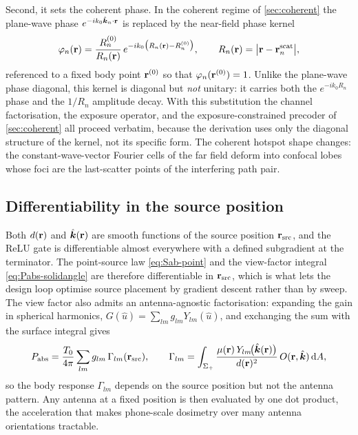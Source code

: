 Second, it sets the coherent phase. In the coherent regime of
\cref{sec:coherent} the plane-wave phase $e^{-ik_0\hat{\bm{k}}_n\cdot\mathbf{r}}$ is
replaced by the near-field phase kernel
\begin{equation}\label{eq:NF-kernel}
  \varphi_n(\mathbf{r})=\frac{R_n^{(0)}}{R_n(\mathbf{r})}\,
                 e^{-ik_0\bigl(R_n(\mathbf{r})-R_n^{(0)}\bigr)},
  \qquad R_n(\mathbf{r})=\abs{\mathbf{r}-\mathbf{r}_n^{\mathrm{scat}}},
\end{equation}
referenced to a fixed body point $\mathbf{r}^{(0)}$ so that
$\varphi_n(\mathbf{r}^{(0)})=1$. Unlike the plane-wave phase diagonal, this
kernel is diagonal but \emph{not} unitary: it carries both the
$e^{-ik_0 R_n}$ phase and the $1/R_n$ amplitude decay. With this
substitution the channel factorisation, the exposure operator, and the
exposure-constrained precoder of \cref{sec:coherent} all proceed
verbatim, because the derivation uses only the diagonal structure of
the kernel, not its specific form. The coherent hotspot shape changes:
the constant-wave-vector Fourier cells of the far field deform into
confocal lobes whose foci are the last-scatter points of the
interfering path pair.

\subsection{Differentiability in the source position}

Both $d(\mathbf{r})$ and $\hat{\bm{k}}(\mathbf{r})$ are smooth functions of the source
position $\mathbf{r}_{\mathrm{src}}$, and the ReLU gate is differentiable
almost everywhere with a defined subgradient at the terminator. The
point-source law \cref{eq:Sab-point} and the view-factor integral
\cref{eq:Pabs-solidangle} are therefore differentiable in
$\mathbf{r}_{\mathrm{src}}$, which is what lets the design loop optimise source
placement by gradient descent rather than by sweep. The view factor
also admits an antenna-agnostic factorisation: expanding the gain in
spherical harmonics, $G(\hat u)=\sum_{lm}g_{lm}Y_{lm}(\hat u)$, and
exchanging the sum with the surface integral gives
\begin{equation}\label{eq:Gamma-lm}
  P_{\mathrm{abs}}=\frac{T_0}{4\pi}\sum_{lm}g_{lm}\,\Gamma_{lm}(\mathbf{r}_{\mathrm{src}}),
  \qquad
  \Gamma_{lm}=\int_{\Sigma_+}\frac{\mu(\mathbf{r})\,Y_{lm}\!\bigl(\hat{\bm{k}}(\mathbf{r})\bigr)}
                                  {d(\mathbf{r})^2}\,O(\mathbf{r},\hat{\bm{k}})\,\mathrm{d} A,
\end{equation}
so the body response $\Gamma_{lm}$ depends on the source position but
not the antenna pattern. Any antenna at a fixed position is then
evaluated by one dot product, the acceleration that makes
phone-scale dosimetry over many antenna orientations tractable.

